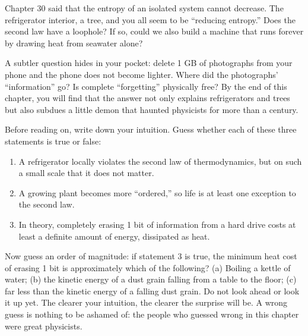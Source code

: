 Chapter 30 said that the entropy of an isolated system cannot decrease. The refrigerator interior, a tree, and you all seem to be ``reducing entropy.'' Does the second law have a loophole? If so, could we also build a machine that runs forever by drawing heat from seawater alone?

A subtler question hides in your pocket: delete 1 GB of photographs from your phone and the phone does not become lighter. Where did the photographs' ``information'' go? Is complete ``forgetting'' physically free? By the end of this chapter, you will find that the answer not only explains refrigerators and trees but also subdues a little demon that haunted physicists for more than a century.


Before reading on, write down your intuition. Guess whether each of these three statements is true or false:

\begin{enumerate}[leftmargin=2em]
\item A refrigerator locally violates the second law of thermodynamics, but on such a small scale that it does not matter.
\item A growing plant becomes more ``ordered,'' so life is at least one exception to the second law.
\item In theory, completely erasing 1 bit of information from a hard drive costs at least a definite amount of energy, dissipated as heat.
\end{enumerate}

Now guess an order of magnitude: if statement 3 is true, the minimum heat cost of erasing 1 bit is approximately which of the following? (a) Boiling a kettle of water; (b) the kinetic energy of a dust grain falling from a table to the floor; (c) far less than the kinetic energy of a falling dust grain. Do not look ahead or look it up yet. The clearer your intuition, the clearer the surprise will be. A wrong guess is nothing to be ashamed of: the people who guessed wrong in this chapter were great physicists.


